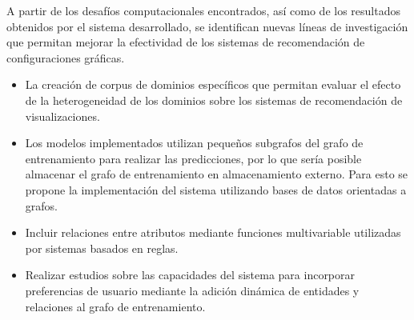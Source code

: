 \begin{recomendations}
    A partir de los desaf\'ios computacionales encontrados, as\'i como de los
    resultados obtenidos por el sistema desarrollado, se identifican nuevas l\'ineas
    de investigaci\'on que permitan mejorar la efectividad de los sistemas de
    recomendaci\'on de configuraciones gr\'aficas.

    \begin{itemize}
        \item La creaci\'on de corpus de dominios espec\'ificos que permitan
        evaluar el efecto de la heterogeneidad de los dominios sobre los sistemas
        de recomendaci\'on de visualizaciones.
        \item Los modelos implementados utilizan peque\~nos subgrafos del grafo de
        entrenamiento para realizar las predicciones, por lo que ser\'ia posible
        almacenar el grafo de entrenamiento en almacenamiento externo. Para esto se propone la
        implementaci\'on del sistema utilizando bases de datos orientadas a grafos.
        \item Incluir relaciones entre atributos mediante funciones multivariable utilizadas por sistemas 
        basados en reglas.
        \item Realizar estudios sobre las capacidades del sistema para incorporar preferencias de usuario
        mediante la adici\'on din\'amica de entidades y relaciones al grafo de entrenamiento.
    \end{itemize}


\end{recomendations}
